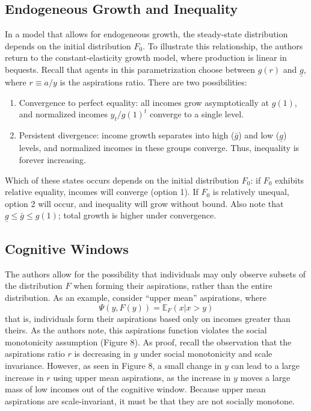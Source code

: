 \documentclass[11pt]{article}
\begin{document}
    \subsection{Endogeneous Growth and Inequality}
    In a model that allows for endogeneous growth, the steady-state distribution depends on the initial distribution \( F_0 \). To illustrate this relationship, the authors return to the constant-elasticity growth model, where production is linear in bequests. Recall that agents in this parametrization choose between \( g(r) \) and \( \underline{g} \), where \( r\equiv a/y \) is the aspirations ratio. There are two possibilities:
    \begin{enumerate}
        \item Convergence to perfect equality: all incomes grow asymptotically at \( g(1) \), and normalized incomes \( y_t / g(1)^t \) converge to a single level.
        \item Persistent divergence: income growth separates into high (\( \bar{g} \)) and low (\( \underline{g} \)) levels, and normalized incomes in these groups converge. Thus, inequality is forever increasing.
    \end{enumerate}
    Which of these states occurs depends on the initial distribution \( F_0 \): if \( F_0 \) exhibits relative equality, incomes will converge (option 1). If \( F_0 \) is relatively unequal, option 2 will occur, and inequality will grow without bound. Also note that \( \underline{g} \leq \bar{g} \leq g(1) \); total growth is higher under convergence. 

    \subsection{Cognitive Windows}
    The authors allow for the possibility that individuals may only observe subsets of the distribution \( F \) when forming their aspirations, rather than the entire distribution. As an example, consider ``upper mean'' aspirations, where
    \[\Psi(y, F(y)) = \mathbb{E}_F(x | x > y)\]
    that is, individuals form their aspirations based only on incomes greater than theirs. As the authors note, this aspirations function violates the social monotonicity assumption (Figure 8). As proof, recall the observation that the aspirations ratio \( r \) is decreasing in \( y \) under social monotonicity and scale invariance. However, as seen in Figure 8, a small change in \( y \) can lead to a large increase in \( r \) using upper mean aspirations, as the increase in \( y \) moves a large mass of low incomes out of the cognitive window. Because upper mean aspirations are scale-invariant, it must be that they are not socially monotone. %
\end{document}
